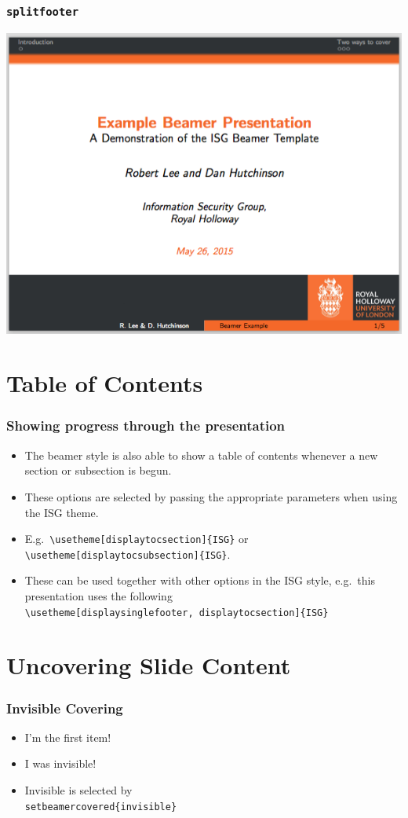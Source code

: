 \documentclass{beamer}
\begin{document}
\begin{frame}\frametitle{\texttt{splitfooter}}
\begin{center}
	\includegraphics[scale=0.4]{graphics/splitfooter.png}
\end{center}
\end{frame}

\section{Table of Contents}
\begin{frame}\frametitle{Showing progress through the presentation}
\begin{itemize}
	\item The beamer style is also able to show a table of contents whenever a new section or subsection is begun.
	\item These options are selected by passing the appropriate parameters when using the ISG theme.
	\item E.g.\ \texttt{\textbackslash usetheme[displaytocsection]\{ISG\}} or \texttt{\textbackslash usetheme[displaytocsubsection]\{ISG\}}.
	\item These can be used together with other options in the ISG style, e.g.\ this presentation uses the following\\ {\scriptsize\texttt{\textbackslash usetheme[displaysinglefooter, displaytocsection]\{ISG\}}}
\end{itemize}
\end{frame}

\section{Uncovering Slide Content}
\begin{frame}\frametitle{Invisible Covering}
\begin{itemize}
	\item I'm the first item!
	\pause
	\item I was invisible!
	\pause
	\item Invisible is selected by \texttt{\\setbeamercovered\{invisible\}}
\end{itemize}
\end{frame}
\end{document}
